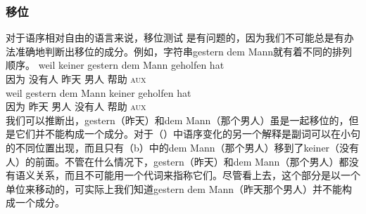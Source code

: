 \subsubsection{移位}
对于语序相对自由的语言来说，移位测试 是有问题的，因为我们不可能总是有办法准确地判断出移位的成分。例如，字符串gestern dem Mann就有着不同的排列顺序。
\eal
\ex 
\gll weil keiner gestern dem Mann geholfen hat\\
     因为 没有人 昨天  男人 帮助 \textsc{aux}\\
\ex 
\gll weil gestern dem Mann keiner geholfen hat\\
	 因为 昨天  男人 没有人 帮助 \textsc{aux}\\
\zl
我们可以推断出，gestern（昨天）和dem Mann（那个男人）虽是一起移位的，但是它们并不能构成一个成分。对于（）中语序变化的另一个解释是副词可以在小句的不同位置出现，而且只有（b）中的dem Mann（那个男人）移到了keiner（没有人）的前面。不管在什么情况下，gestern（昨天）和dem Mann（那个男人）都没有语义关系，而且不可能用一个代词来指称它们。尽管看上去，这个部分是以一个单位来移动的，可实际上我们知道gestern dem Mann（昨天那个男人）并不能构成一个成分。

